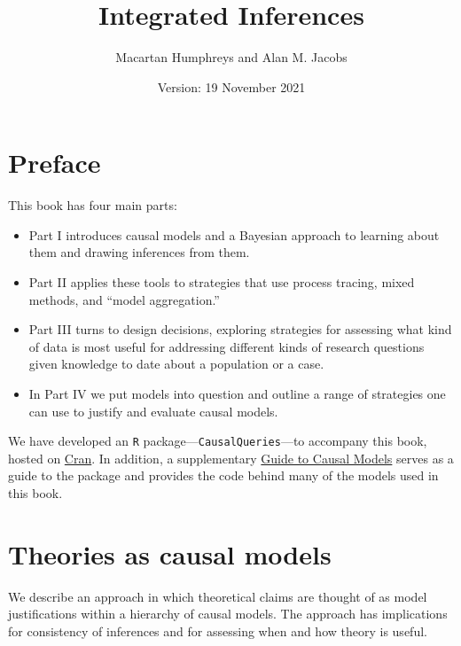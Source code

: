 \documentclass[
  12pt,
]{book}
\title{Integrated Inferences}
\author{Macartan Humphreys and Alan M. Jacobs}
\date{Version: 19 November 2021}
\newenvironment{headerbox}{
  \definecolor{shadecolor}{rgb}{0.8, 0.8, 0.8}  %
  \color{black}
  \begin{shaded}}{\end{shaded}}
\begin{document}
\maketitle

{
\setcounter{tocdepth}{1}
\tableofcontents
}
\hypertarget{preface}{%
\chapter*{Preface}\label{preface}}

This book has four main parts:

\begin{itemize}
\item
  Part I introduces causal models and a Bayesian approach to learning about them and drawing inferences from them.
\item
  Part II applies these tools to strategies that use process tracing, mixed methods, and ``model aggregation.''
\item
  Part III turns to design decisions, exploring strategies for assessing what kind of data is most useful for addressing different kinds of research questions given knowledge to date about a population or a case.
\item
  In Part IV we put models into question and outline a range of strategies one can use to justify and evaluate causal models.
\end{itemize}

We have developed an \texttt{R} package---\texttt{CausalQueries}---to accompany this book, hosted on \href{https://cran.r-project.org/web/packages/CausalQueries/index.html}{Cran}. In addition, a supplementary \href{https://macartan.github.io/causalmodels/}{Guide to Causal Models} serves as a guide to the package and provides the code behind many of the models used in this book.

\hypertarget{theory}{%
\chapter{Theories as causal models}\label{theory}}

\begin{headerbox}
We describe an approach in which theoretical claims are thought of as model justifications within a hierarchy of causal models. The approach has implications for consistency of inferences and for assessing when and how theory is useful.

\end{headerbox}
\end{document}

